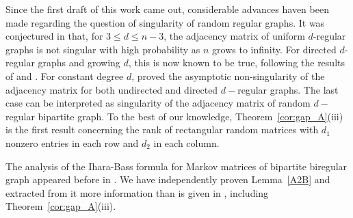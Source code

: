 \begin{remark}
Since the first draft of this work came out, considerable advances haven been made regarding the question of singularity of random regular graphs. It was conjectured in \citet*{costello2008} that, for $3\leq d\leq n-3$, the adjacency matrix of uniform $d$-regular graphs is not singular with high probability as $n$ grows to infinity. For directed $d$-regular graphs and growing $d$, this is now known to be true, following the results of \citet*{cook2017} and \citet*{litvak2016, litvak2017}. 
For constant degree $d$, \citet*{huang2018a,huang2018b} proved the asymptotic non-singularity of the adjacency matrix for both undirected and directed $d-$regular graphs. The last case can be interpreted as singularity of the adjacency matrix of random $d-$regular bipartite graph. To the best of our knowledge, Theorem~\ref{cor:gap_A}(iii) is the first result concerning the rank of rectangular random matrices with $d_1$ nonzero entries in each row and $d_2$ in each column.  
\end{remark}

\begin{remark} The analysis of the Ihara-Bass formula for Markov matrices of bipartite biregular graph appeared before in \citet*{kempton2016}. We have independently proven Lemma~\ref{A2B} and extracted from it more information than is given in \citet*{kempton2016}, including Theorem~\ref{cor:gap_A}(iii). 
\end{remark}

